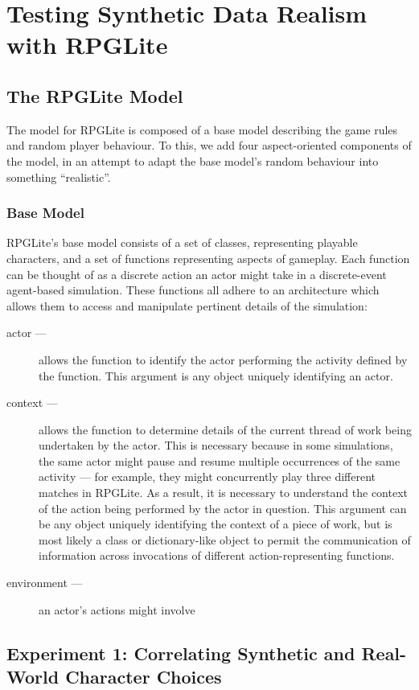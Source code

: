 \chapter{Testing Synthetic Data Realism with RPGLite}

\section{The RPGLite Model}

The model for RPGLite is composed of a base model describing the game rules and
random player behaviour. To this, we add four aspect-oriented components of the
model, in an attempt to adapt the base model's random behaviour into something
``realistic''.

\subsection{Base Model}
RPGLite's base model consists of a set of classes, representing playable
characters, and a set of functions representing aspects of gameplay. Each
function can be thought of as a discrete action an actor might take in a
discrete-event agent-based simulation. These functions all adhere to an
architecture which allows them to access and manipulate pertinent details of the
simulation:

\begin{description}
  \item[actor — ] allows the function to identify the actor performing the activity
    defined by the function. This argument is any object uniquely identifying an
    actor.
    \item[context — ] allows the function to determine details of the current
      thread of work being undertaken by the actor. This is necessary because in
      some simulations, the same actor might pause and resume multiple
      occurrences of the same activity --- for example, they might concurrently
      play three different matches in RPGLite. As a result, it is necessary to
      understand the context of the action being performed by the actor in
      question. This argument can be any object uniquely identifying the context
      of a piece of work, but is most likely a class or dictionary-like object
      to permit the communication of information across invocations of different
      action-representing functions.
      \item[environment — ] an actor's actions might involve 
\end{description}





\section{Experiment 1: Correlating Synthetic and Real-World Character Choices}

